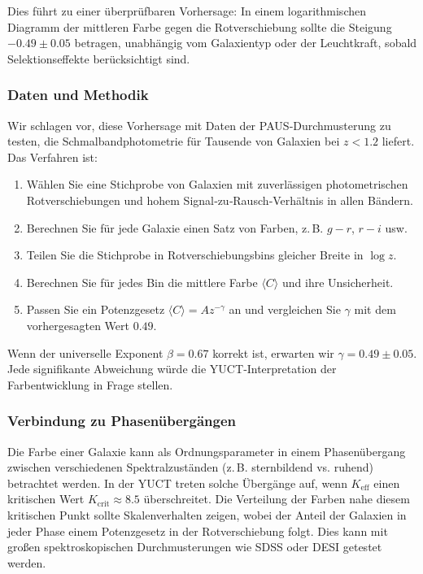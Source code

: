 \documentclass[11pt,a4paper]{article}
\begin{document}
	Dies führt zu einer überprüfbaren Vorhersage: In einem logarithmischen Diagramm der mittleren Farbe gegen die Rotverschiebung sollte die Steigung \(-0.49 \pm 0.05\) betragen, unabhängig vom Galaxientyp oder der Leuchtkraft, sobald Selektionseffekte berücksichtigt sind.
	
	\subsubsection{Daten und Methodik}
	
	Wir schlagen vor, diese Vorhersage mit Daten der PAUS‑Durchmusterung \cite{Alarcon2019} zu testen, die Schmalbandphotometrie für Tausende von Galaxien bei \(z < 1.2\) liefert. Das Verfahren ist:
	\begin{enumerate}
		\item Wählen Sie eine Stichprobe von Galaxien mit zuverlässigen photometrischen Rotverschiebungen und hohem Signal‑zu‑Rausch‑Verhältnis in allen Bändern.
		\item Berechnen Sie für jede Galaxie einen Satz von Farben, z. B. \(g-r\), \(r-i\) usw.
		\item Teilen Sie die Stichprobe in Rotverschiebungsbins gleicher Breite in \(\log z\).
		\item Berechnen Sie für jedes Bin die mittlere Farbe \(\langle C \rangle\) und ihre Unsicherheit.
		\item Passen Sie ein Potenzgesetz \(\langle C \rangle = A z^{-\gamma}\) an und vergleichen Sie \(\gamma\) mit dem vorhergesagten Wert \(0.49\).
	\end{enumerate}
	
	Wenn der universelle Exponent \(\beta = 0.67\) korrekt ist, erwarten wir \(\gamma = 0.49 \pm 0.05\). Jede signifikante Abweichung würde die YUCT‑Interpretation der Farbentwicklung in Frage stellen.
	
	\subsubsection{Verbindung zu Phasenübergängen}
	
	Die Farbe einer Galaxie kann als Ordnungsparameter in einem Phasenübergang zwischen verschiedenen Spektralzuständen (z. B. sternbildend vs. ruhend) betrachtet werden. In der YUCT treten solche Übergänge auf, wenn \(K_{\mathrm{eff}}\) einen kritischen Wert \(K_{\mathrm{crit}} \approx 8.5\) überschreitet. Die Verteilung der Farben nahe diesem kritischen Punkt sollte Skalenverhalten zeigen, wobei der Anteil der Galaxien in jeder Phase einem Potenzgesetz in der Rotverschiebung folgt. Dies kann mit großen spektroskopischen Durchmusterungen wie SDSS oder DESI getestet werden.
	
\end{document}
